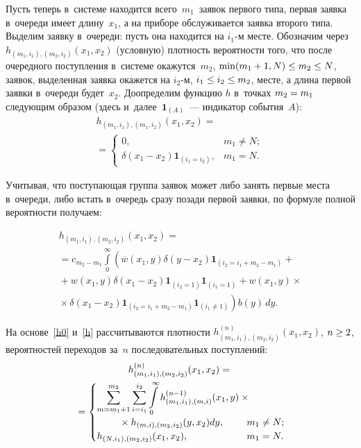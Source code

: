 \begin{multicols}{2}
Пусть теперь в~системе находится всего~$m_1$~заявок первого типа,
первая заявка в~очереди имеет длину~$x_1$,
а на приборе обслуживается заявка второго типа.
Выделим заявку в~очереди: пусть она находится
на $i_1$-м месте. Обозначим через $h_{(m_1,i_1),(m_2,i_2)}(x_1,x_2)$
(условную) плот\-ность вероятности того, что после очередного поступления
в~сис\-те\-ме окажутся~$m_2$, ${\min(m_1+1,N)\hm\le m_2 \hm\le N}$, заявок,
выделенная заявка окажется на $i_2$-м,  ${i_1 \hm\le i_2 \hm\le m_2}$,  месте,
а длина первой заявки в~очереди будет~$x_2$.
Доопределим функцию $h$ в~точках $m_2\hm=m_1$
следующим образом (здесь и~далее~$\mathbf{1}_{(A)}$~--- индикатор события~$A$):
\begin{multline}
\label{h0}
h_{(m_1,i_1),(m_1,i_2)}(x_1,x_2)
={}\\
{}=
\begin{cases}
0, & m_1 \neq N;\\
\delta(x_1-x_2) \mathbf{1}_{(i_1=i_2)}, & m_1=N.
\end{cases}
\end{multline}

\noindent
Учитывая, что поступающая группа заявок может либо занять
первые места в~очереди, либо встать в~очередь
сразу позади первой заявки, по формуле полной вероятности
получаем:
\pagebreak

\noindent
\begin{multline}
\label{h}
h_{(m_1,i_1),(m_2,i_2)}(x_1,x_2)
={}\\
{}= c_{m_2-m_1} \int\limits_0^\infty
\left (\overline{w}(x_1,y)
\delta(y-x_2) \mathbf{1}_{(i_2=i_1+m_2-m_1)}
+{}\right. \\
{}+ w(x_1,y) \delta(x_1-x_2) \mathbf{1}_{(i_2=1)} \mathbf{1}_{(i_1=1)}
+ w(x_1,y)\times{}\\
\left.
{}\times
\delta(x_1-x_2) \mathbf{1}_{(i_2=i_1+m_2-m_1)}
\mathbf{1}_{(i_1\neq 1)} \right ) b(y)\,dy.
\end{multline}

\noindent 
На основе~\eqref{h0} и~\eqref{h}
рассчитываются плотности $h^{(n)}_{(m_1,i_1),(m_2,i_2)}(x_1,x_2)$,
 $n \hm\ge 2$, вероятностей
переходов за~$n$ последовательных поступлений:
\begin{multline*}
h^{(n)}_{(m_1,i_1),(m_2,i_2)}(x_1,x_2)
={}\\
{}=
\begin{cases}
\displaystyle
\sum\limits_{m=m_1+1}^{m_2}
\sum\limits_{i=i_1}^{i_2}
\int\limits_{0}^\infty
h^{(n-1)}_{(m_1,i_1),(m,i)}(x_1,y)\times{}&\\
{}\hspace*{8mm}\times h_{(m,i),(m_2,i_2)}(y,x_2) dy, & \hspace*{-5mm}m_1 \neq N;
\\
h_{(N,i_1),(m_2,i_2)}(x_1,x_2), & \hspace*{-5mm}m_1=N.
\end{cases}
\end{multline*}


\end{multicols}
